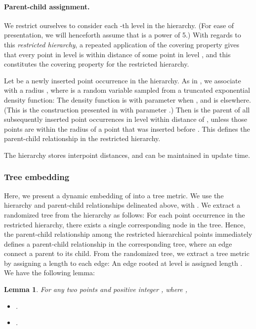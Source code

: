 \documentclass[11pt]{article}
\newtheorem{lemma}[theorem]{Lemma}
\begin{document}
\paragraph{Parent-child assignment.}
We restrict ourselves to consider each -th level in
the hierarchy. (For ease of presentation, we
will henceforth assume that  is a power of 5.) With regards to this
{\em restricted hierarchy}, a repeated application of the covering property
gives that every point in level  is within
distance  of some point in level , and this
constitutes the covering property for the restricted hierarchy.

Let  be a newly inserted point occurrence in the hierarchy.
As in \cite{AbBaNe08}, we associate with  a radius
, where  is a random
variable sampled from a truncated exponential density function:
The density function is 
with parameter  when
, and is  elsewhere. (This is the construction presented
in \cite{AbBaNe08} with parameter .)
Then  is the parent of all subsequently inserted point occurrences in level
 within distance  of , unless those points are within
the radius  of a point  that was inserted before .
This defines the parent-child relationship in the restricted hierarchy.

The hierarchy stores  interpoint distances, and can be maintained in
 update
time.



\subsubsection{Tree embedding}\label{sec:dyn-tree}

Here, we present a dynamic embedding of  into a tree metric. We use
the hierarchy and parent-child relationships delineated above, with
. We extract a randomized tree from the hierarchy as follows:
For each point occurrence in the restricted hierarchy, there exists a
single corresponding node in the tree. Hence, the parent-child
relationship among the restricted hierarchical points
immediately defines a parent-child relationship in the corresponding tree,
where an edge connect a parent to its child.
From the randomized tree, we extract a tree metric  by
assigning a length to each edge: An edge rooted at level  is
assigned length . We have the following lemma:

\begin{lemma}\label{lem:tree-embed}
For any two points  and positive integer , where ,
\begin{itemize}
\item
.
\item
.
\end{itemize}
\end{lemma}
\end{document}
